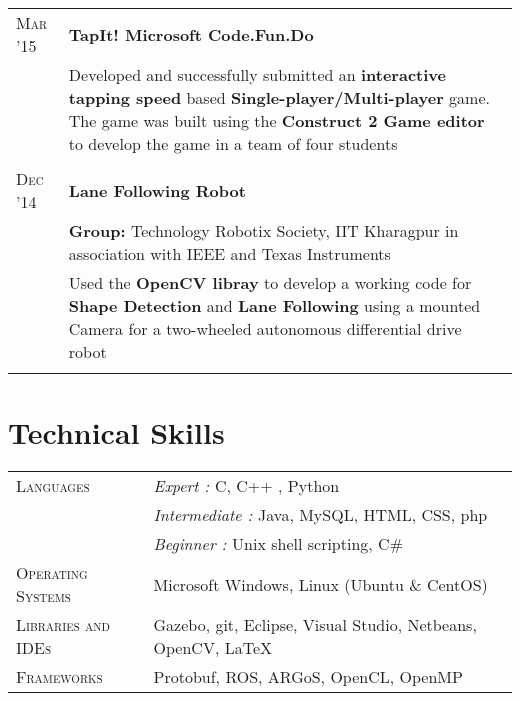 \documentclass[a4paper,10pt]{extarticle} %
\begin{document}
\begin{tabular}{R{3.0cm}|p{15.0cm}}

\textsc{Mar '15} & \textbf{TapIt! Microsoft Code.Fun.Do}\\
& \textmd{Developed and successfully submitted an \textbf{interactive tapping speed} based \textbf{Single-player/Multi-player} game. The game was built using the \textbf{Construct 2 Game editor} to develop the game in a team of four students}\\
 \\

\textsc{Dec '14} & \textbf{Lane Following Robot} \\
& \textbf{Group: }\textmd{Technology Robotix Society}, IIT Kharagpur in association with IEEE and Texas Instruments\\
& \textmd{Used the \textbf{OpenCV libray} to develop a working code for \textbf{Shape Detection} and \textbf{Lane Following} using a mounted Camera for a two-wheeled autonomous differential drive robot}\\
 \\

\end{tabular}


\section{Technical Skills}

\begin{tabular}{R{3.0cm}|p{15.0cm}}
\textsc{Languages} & {\itshape{Expert : }}C, C++ , Python \\
& {\itshape{Intermediate : }}Java, MySQL, HTML, CSS, php\\
& {\itshape{Beginner : }}Unix shell scripting, C\# \\
\textsc{Operating Systems} &  Microsoft Windows, Linux (Ubuntu \& CentOS)\\
\textsc{Libraries and IDEs} & Gazebo, git, Eclipse, Visual Studio, Netbeans, OpenCV, LaTeX\\
\textsc{Frameworks} & Protobuf, ROS, ARGoS, OpenCL, OpenMP\\
\end{tabular}
\end{document}
